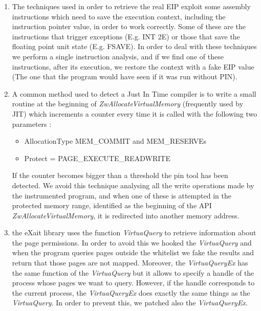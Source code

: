 \begin{enumerate}

\item The techniques used in order to retrieve the real EIP exploit some assembly instructions which need to save the execution context, including the instruction pointer value, in order to work correctly. Some of these are the instructions that trigger exceptions (E.g. INT 2E) or those that save the floating point unit state (E.g. FSAVE). In order to deal with these techniques we perform a single instruction analysis, and if we find one of these instructions, after its execution, we restore the context with a fake EIP value (The one that the program would have seen if it was run without PIN).

\item A common method used to detect a Just In Time compiler is to write a small routine at the beginning of \textit{ZwAllocateVirtualMemory} (frequently used by JIT) which increments a counter every time it is called with the following two parameters : 

\begin{itemize}
\item AllocationType MEM\_COMMIT and MEM\_RESERVEs

\item Protect = PAGE\_EXECUTE\_READWRITE
\end{itemize}

If the counter becomes bigger than a threshold the pin tool has been detected. We avoid this technique analysing all the write operations made by the instrumented program, and when one of these is attempted in the protected memory range, identified as the beginning of the API \textit{ZwAllocateVirtualMemory}, it is redirected into another memory address.

\item the eXait library uses the function \textit{VirtuaQuery} to retrieve information about the page permissions. In order to avoid this we hooked the \textit{VirtuaQuery} and when the program queries pages outside the whitelist we fake the results and return that those pages are not mapped. Moreover, the \textit{VirtuaQueryEx} has the same function of the \textit{VirtuaQuery} but it allows to specify a handle of the process whose pages we want to query. However, if the handle corresponds to the current process, the \textit{VirtuaQueryEx} does exactly the same things as the \textit{VirtuaQuery}. In order to prevent this, we patched also the \textit{VirtuaQueryEx}.


\end{enumerate}

